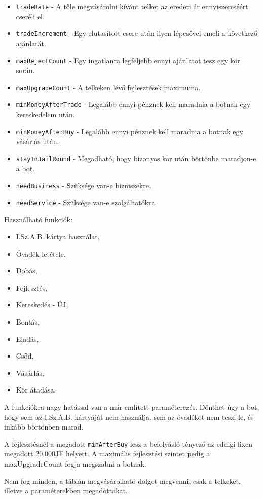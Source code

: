 \begin{itemize}
\item \texttt{tradeRate} - A tőle megvásárolni kívánt telket az eredeti ár ennyiszereséért cseréli el.
\item \texttt{tradeIncrement} - Egy elutasított csere után ilyen lépcsővel emeli a következő ajánlatát.
\item \texttt{maxRejectCount} - Egy ingatlanra legfeljebb ennyi ajánlatot tesz egy kör során.
\item \texttt{maxUpgradeCount} - A telkeken lévő fejlesztések maximuma.
\item \texttt{minMoneyAfterTrade} - Legalább ennyi pénznek kell maradnia a botnak egy kereskedelem után.
\item \texttt{minMoneyAfterBuy} - Legalább ennyi pénznek kell maradnia a botnak egy vásárlás után.
\item \texttt{stayInJailRound} - Megadható, hogy bizonyos kör után börtönbe maradjon-e a bot.
\item \texttt{needBusiness} - Szüksége van-e bizniszekre.
\item \texttt{needService} - Szüksége van-e szolgáltatókra.
\end{itemize}

Használható funkciók:
\begin{itemize}
\item I.Sz.A.B. kártya használat,
\item Óvadék letétele,
\item Dobás,
\item Fejlesztés,
\item Kereskedés - ÚJ,
\item Bontás,
\item Eladás,
\item Csőd,
\item Vásárlás,
\item Kör átadása.
\end{itemize}

A funkciókra nagy hatással van a már említett paraméterezés. Dönthet úgy a bot, hogy sem az I.Sz.A.B. kártyáját nem használja, sem az óvadékot nem teszi le, és inkább börtönben marad.

A fejlesztésnél a megadott \texttt{minAfterBuy} lesz a befolyásló tényező az eddigi fixen megadott 20.000JF helyett. A maximális fejlesztési szintet pedig a maxUpgradeCount fogja megszabni a botnak.

Nem fog minden, a táblán megvásárolható dolgot megvenni, csak a telkeket, illetve a paraméterekben megadottakat.

